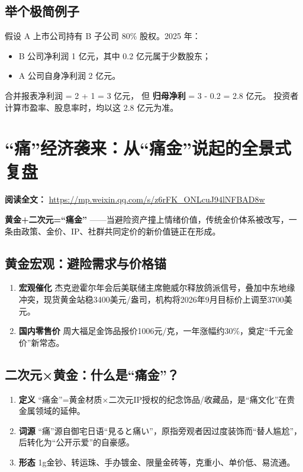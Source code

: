 \subsection{举个极简例子}
假设 A 上市公司持有 B 子公司 80\% 股权。2025 年：
\begin{itemize}[nosep]
    \item B 公司净利润 1 亿元，其中 0.2 亿元属于少数股东；
    \item A 公司自身净利润 2 亿元。
\end{itemize}
合并报表净利润 = 2 + 1 = 3 亿元，  
但 \textbf{归母净利} = 3 - 0.2 = 2.8 亿元。  
投资者计算市盈率、股息率时，均以这 2.8 亿元为准。



\section{“痛”经济袭来：从“痛金”说起的全景式复盘}
\vspace{1cm}
\noindent\textbf{阅读全文：} \url{https://mp.weixin.qq.com/s/z6rFK_ONLcuJ94lNFBAD8w}

\textbf{黄金+二次元=“痛金”}  
——当避险资产撞上情绪价值，传统金价体系被改写，一条由政策、金价、IP、社群共同定价的新价值链正在形成。

\subsection{黄金宏观：避险需求与价格锚}
\begin{enumerate}[leftmargin=*, nosep]
    \item \textbf{宏观催化}  
    杰克逊霍尔年会后美联储主席鲍威尔释放鸽派信号，叠加中东地缘冲突，现货黄金站稳3400美元/盎司，机构将2026年9月目标价上调至3700美元。
    \item \textbf{国内零售价}  
    周大福足金饰品报价1006元/克，一年涨幅约30\%，奠定“千元金价”新常态。
\end{enumerate}

\subsection{二次元×黄金：什么是“痛金”？}
\begin{enumerate}[leftmargin=*, nosep]
    \item \textbf{定义}  
    “痛金”=黄金材质×二次元IP授权的纪念饰品/收藏品，是“痛文化”在贵金属领域的延伸。
    \item \textbf{词源}  
    “痛”源自御宅日语“見ると痛い”，原指旁观者因过度装饰而“替人尴尬”，后转化为“公开示爱”的自豪感。
    \item \textbf{形态}  
    1g金钞、转运珠、手办镀金、限量金砖等，克重小、单价低、易流通。
\end{enumerate}

